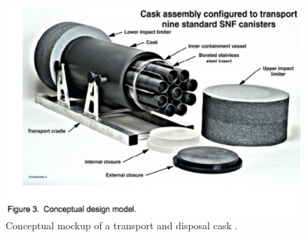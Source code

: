 \begin{figure}[htbp!]
  \begin{center}
    \includegraphics[width=0.7\textheight]{cask_ineel.eps}
  \end{center}
  \caption{Conceptual mockup of a transport and disposal cask 
    \cite{bridges_standardized_2001}.}
  \label{fig:packages}
\end{figure}

